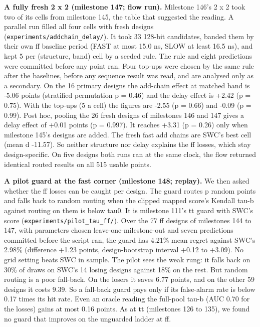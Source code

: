\documentclass[conference]{IEEEtran}
\begin{document}
\textbf{A fully fresh 2 x 2 (milestone 147; flow run).} Milestone 146's
2 x 2 took two of its cells from milestone 145, the table that suggested
the reading. A parallel run filled all four cells with fresh designs
(\texttt{experiments/\allowbreak{}addchain\_\allowbreak{}delay/\allowbreak{}}). It took 33 128-bit candidates,
banded them by their own ff baseline period (FAST at most 15.0 ns, SLOW
at least 16.5 ns), and kept 5 per (structure, band) cell by a seeded
rule. The rule and eight predictions were committed before any point
ran. Four top-ups were chosen by the same rule after the baselines,
before any sequence result was read, and are analysed only as a
secondary. On the 16 primary designs the add-chain effect at matched
band is -5.06 points (stratified permutation p = 0.46) and the delay
effect is +2.42 (p = 0.75). With the top-ups (5 a cell) the figures are
-2.55 (p = 0.66) and -0.09 (p = 0.99). Post hoc, pooling the 26 fresh
designs of milestones 146 and 147 gives a delay effect of +0.01 points
(p = 0.997). It reaches +3.31 (p = 0.26) only when milestone 145's
designs are added. The fresh fast add chains are SWC's best cell (mean d
-11.57). So neither structure nor delay explains the ff losses, which
stay design-specific. On five designs both runs ran at the same clock,
the flow returned identical routed results on all 515 usable points.

\textbf{A pilot guard at the fast corner (milestone 148; replay).} We
then asked whether the ff losses can be caught per design. The guard
routes p random points and falls back to random routing when the clipped
mapped score's Kendall tau-b against routing on them is below tau0. It
is milestone 111's tt guard with SWC's score
(\texttt{experiments/\allowbreak{}pilot\_\allowbreak{}tau\_\allowbreak{}ff/\allowbreak{}}). Over the 77 ff designs of
milestones 144 to 147, with parameters chosen leave-one-milestone-out
and seven predictions committed before the script ran, the guard has
4.21\% mean regret against SWC's 2.98\% (difference +1.23 points,
design-bootstrap interval +0.12 to +3.09). No grid setting beats SWC in
sample. The pilot sees the weak rung: it falls back on 30\% of draws on
SWC's 14 losing designs against 18\% on the rest. But random routing is
a poor fall-back. On the losers it saves 6.77 points, and on the other
59 designs it costs 9.39. So a fall-back guard pays only if its
false-alarm rate is below 0.17 times its hit rate. Even an oracle
reading the full-pool tau-b (AUC 0.70 for the losses) gains at most 0.16
points. As at tt (milestones 126 to 135), we found no guard that
improves on the unguarded ladder at ff.
\end{document}
